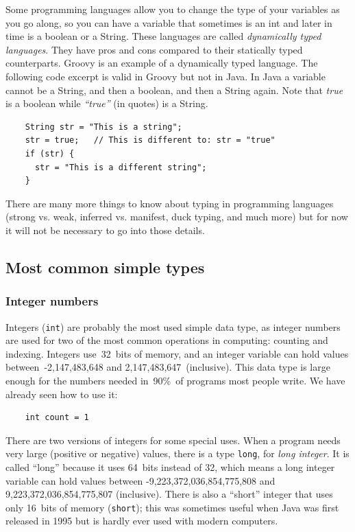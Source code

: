 Some programming languages allow you to change the type of your
variables as you go along, so you can have a variable that sometimes
is an int and later in time is a boolean or a String. These languages
are called \emph{dynamically typed languages}. They have pros and cons
compared to their statically typed counterparts. Groovy is an example
of a dynamically typed language. The following code excerpt is valid
in Groovy but not in Java. In Java a variable cannot be a String, and
then a boolean, and then a String again. Note that \emph{true} is a
boolean while \emph{``true''} (in quotes) is a String. 

\begin{verbatim}
    String str = "This is a string";
    str = true;   // This is different to: str = "true"
    if (str) {
      str = "This is a different string";
    }
\end{verbatim}

There are many more things to know about typing in programming
languages (strong vs. weak, inferred vs. manifest, duck typing, and
much more) but for now it will not be necessary to go into those
details. 

\subsection{Most common simple types}
\label{sec:most-common-simple}

\subsubsection{Integer numbers}
\label{sec:integers}

Integers (\verb+int+) are probably the most used simple data type, as
integer numbers are used for two of the most common operations in
computing: counting and indexing. Integers use~32~bits of memory, and
an integer variable can hold values between~-2,147,483,648 and
2,147,483,647~(inclusive). This data type is large enough for the
numbers needed in~90\%~of programs most people write. We have already
seen how to use it: 

\begin{verbatim}
    int count = 1
\end{verbatim}

There are two versions of integers for some special uses. When a
program needs very large (positive or negative) values, there is a
type \verb+long+, for \emph{long integer}. It is called ``long''
because it uses 64~bits instead of 32, which means a long integer
variable can hold values between -9,223,372,036,854,775,808 and
9,223,372,036,854,775,807 (inclusive). There is also a ``short''
integer that uses only 16~bits of memory (\verb+short+); this was
sometimes useful when Java was first released in 1995 but is hardly
ever used with modern computers. 

